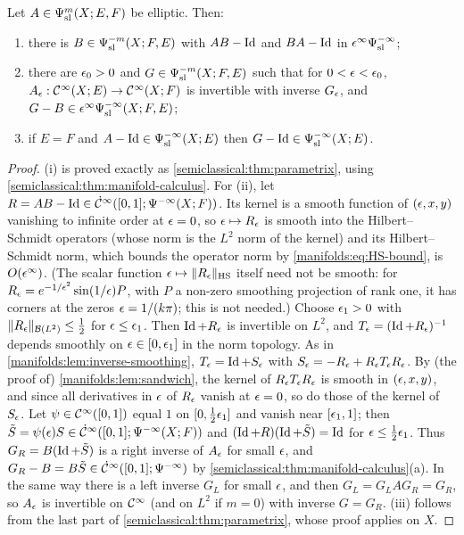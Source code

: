 \begin{theorem}\label{semiclassical:thm:invertible}
  Let $A\in\Psi^{m}_{\mathrm{sl}}(X;E,F)$ be elliptic. Then:
  \begin{enumerate}[label=\textup{(\roman*)}]
  \item there is $B\in\Psi^{-m}_{\mathrm{sl}}(X;F,E)$ with $AB-\operatorname{Id}$ and $BA-\operatorname{Id}$ in
    $\epsilon^\infty\Psi^{-\infty}_{\mathrm{sl}}$;
  \item there are $\epsilon_0>0$ and $G\in\Psi^{-m}_{\mathrm{sl}}(X;F,E)$ such that for $0<\epsilon<\epsilon_0$,
    $A_\epsilon:\mathcal{C}^\infty(X;E)\to\mathcal{C}^\infty(X;F)$ is invertible with inverse $G_\epsilon$, and
    $G-B\in\epsilon^\infty\Psi^{-\infty}_{\mathrm{sl}}(X;F,E)$;
  \item if $E=F$ and $A-\operatorname{Id}\in\Psi^{-\infty}_{\mathrm{sl}}(X;E)$ then $G-\operatorname{Id}\in\Psi^{-\infty}_{\mathrm{sl}}(X;E)$.
  \end{enumerate}
\end{theorem}
\begin{proof}
  (i) is proved exactly as \cref{semiclassical:thm:parametrix}, using
  \cref{semiclassical:thm:manifold-calculus}. For (ii), let
  $R=AB-\operatorname{Id}\in\dot{\mathcal{C}}^\infty([0,1];\Psi^{-\infty}(X;F))$. Its kernel is a smooth function of
  $(\epsilon,x,y)$ vanishing to infinite order at $\epsilon=0$, so $\epsilon\mapsto R_\epsilon$ is smooth into the
  Hilbert--Schmidt operators (whose norm is the $L^2$ norm of the kernel) and its
  Hilbert--Schmidt norm, which bounds the operator norm by
  \eqref{manifolds:eq:HS-bound}, is $O(\epsilon^\infty)$. (The scalar function
  $\epsilon\mapsto\lVert R_\epsilon\rVert_{\mathrm{HS}}$ itself need not be smooth: for
  $R_\epsilon=e^{-1/\epsilon^2}\sin(1/\epsilon)P$, with $P$ a non-zero smoothing projection of rank one,
  it has corners at the zeros $\epsilon=1/(k\pi)$; this is not needed.) Choose $\epsilon_1>0$ with
  $\lVert R_\epsilon\rVert_{\mathcal{B}(L^2)}\le\frac12$ for $\epsilon\le\epsilon_1$. Then $\operatorname{Id}+R_\epsilon$ is invertible
  on $L^2$, and $T_\epsilon=(\operatorname{Id}+R_\epsilon)^{-1}$ depends smoothly on $\epsilon\in[0,\epsilon_1]$ in the
  norm topology. As in \cref{manifolds:lem:inverse-smoothing},
  $T_\epsilon=\operatorname{Id}+S_\epsilon$ with $S_\epsilon=-R_\epsilon+R_\epsilon T_\epsilon R_\epsilon$. By (the proof of)
  \cref{manifolds:lem:sandwich}, the kernel of $R_\epsilon T_\epsilon R_\epsilon$ is smooth in
  $(\epsilon,x,y)$, and since all derivatives in $\epsilon$ of $R_\epsilon$ vanish at $\epsilon=0$,
  so do those of the kernel of $S_\epsilon$. Let $\psi\in\mathcal{C}^\infty([0,1])$ equal $1$ on
  $[0,\frac12\epsilon_1]$ and vanish near $[\epsilon_1,1]$; then
  $\tilde S=\psi(\epsilon)S\in\dot{\mathcal{C}}^\infty([0,1];\Psi^{-\infty}(X;F))$ and
  $(\operatorname{Id}+R)(\operatorname{Id}+\tilde S)=\operatorname{Id}$ for $\epsilon\le\frac12\epsilon_1$. Thus $G_R=B(\operatorname{Id}+\tilde S)$
  is a right inverse of $A_\epsilon$ for small $\epsilon$, and
  $G_R-B=B\tilde S\in\dot{\mathcal{C}}^\infty([0,1];\Psi^{-\infty})$ by
  \cref{semiclassical:thm:manifold-calculus}(a). In the same way there is a left
  inverse $G_L$ for small $\epsilon$, and then $G_L=G_LAG_R=G_R$, so $A_\epsilon$ is
  invertible on $\mathcal{C}^\infty$ (and on $L^2$ if $m=0$) with inverse $G=G_R$. (iii) follows
  from the last part of \cref{semiclassical:thm:parametrix}, whose proof applies
  on $X$.
\end{proof}

